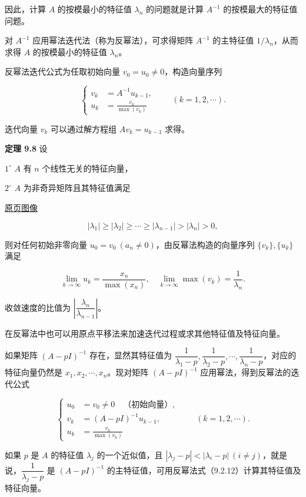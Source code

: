 \documentclass[
  10pt,
  fontset=fandol]{ctexart}
\begin{document}
因此，计算 \(A\) 的按模最小的特征值 \(\lambda_n\) 的问题就是计算 \(A^{-1}\) 的按模最大的特征值问题。

对 \(A^{-1}\) 应用幂法迭代法（称为反幂法），可求得矩阵 \(A^{-1}\) 的主特征值 \(1/\lambda_n\)，从而求得 \(A\) 的按模最小的特征值 \(\lambda_n\)。

反幂法迭代公式为任取初始向量 \(v_0=u_0\ne0\)，构造向量序列

\[
\left\{
\begin{aligned}
v_k&=A^{-1}u_{k-1},\\
u_k&=\frac{v_k}{\max(v_k)}
\end{aligned}
\right.\qquad(k=1,2,\cdots).
\]

迭代向量 \(v_k\) 可以通过解方程组 \(Av_k=u_{k-1}\) 求得。

\textbf{定理 9.8} 设

\(1^\circ\) \(A\) 有 \(n\) 个线性无关的特征向量，

\(2^\circ\) \(A\) 为非奇异矩阵且其特征值满足

\href{../../source-images/pdf-241.jpeg}{原页图像}

\[
|\lambda_1|\geq|\lambda_2|\geq\cdots\geq|\lambda_{n-1}|>|\lambda_n|>0,
\]

则对任何初始非零向量 \(u_0=v_0\ (a_n\ne0)\)，由反幂法构造的向量序列 \(\{v_k\},\{u_k\}\) 满足

\[
\lim_{k\to\infty}u_k=\frac{x_n}{\max(x_n)},\quad\lim_{k\to\infty}\max(v_k)=\frac1{\lambda_n}.
\]

收敛速度的比值为 \(\left|\dfrac{\lambda_n}{\lambda_{n-1}}\right|\)。

在反幂法中也可以用原点平移法来加速迭代过程或求其他特征值及特征向量。

如果矩阵 \((A-pI)^{-1}\) 存在，显然其特征值为 \(\dfrac1{\lambda_1-p},\dfrac1{\lambda_2-p},\cdots,\dfrac1{\lambda_n-p}\)，对应的特征向量仍然是 \(x_1,x_2,\cdots,x_n\)。现对矩阵 \((A-pI)^{-1}\) 应用幂法，得到反幂法的迭代公式

\[
\left\{
\begin{aligned}
u_0&=v_0\ne0\quad\text{（初始向量）},\\
v_k&=(A-pI)^{-1}u_{k-1},\\
u_k&=\frac{v_k}{\max(v_k)}
\end{aligned}
\right.\qquad(k=1,2,\cdots).
\tag{9.2.12}
\]

如果 \(p\) 是 \(A\) 的特征值 \(\lambda_j\) 的一个近似值，且 \(|\lambda_j-p|<|\lambda_i-p|\ (i\ne j)\)，就是说，\(\dfrac1{\lambda_j-p}\) 是 \((A-pI)^{-1}\) 的主特征值，可用反幂法式（9.2.12）计算其特征值及特征向量。
\end{document}
